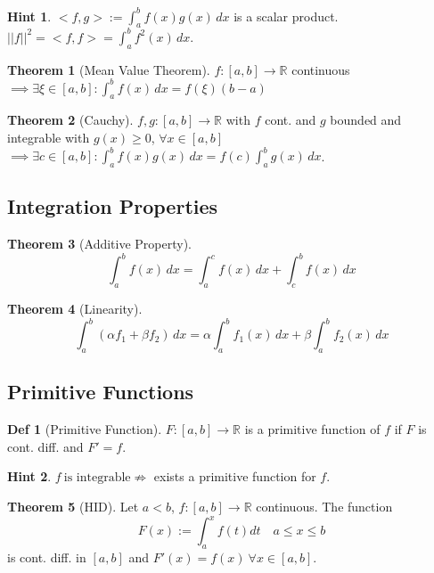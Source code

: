 \documentclass[a4paper, 10pt]{article}
\theoremstyle{definition}
\newtheorem*{definition}{Def}
\newtheorem*{note_wrapper}{Hint}
\theoremstyle{named}
\newtheorem*{ntheorem_wrapper}{Theorem}
\newenvironment{ntheorem}%
    {\begin{mdframed}[style=important]\begin{ntheorem_wrapper}}%
    {\end{ntheorem_wrapper}\end{mdframed}}
\newenvironment{note}%
    {\begin{mdframed}[style=trick]\begin{note_wrapper}}%
    {\end{note_wrapper}\end{mdframed}}
\newcommand{\R}{\mathbb{R}}
\begin{document}
\begin{note}
    $<f, g> := \int_a^b f(x)g(x) \,dx$ is a scalar product. \newline
    $||f||^2 = <f, f> = \int_a^b f^2(x) \,dx$.
\end{note}

\begin{ntheorem}[Mean Value Theorem]
    $f: [a, b] \to \R$ continuous $\implies \exists \xi \in [a, b]: \int_a^b f(x) \,dx = f(\xi)(b - a)$
\end{ntheorem}
\begin{ntheorem}[Cauchy]
    $f, g: [a, b] \to \R$ with $f$ cont. and $g$ bounded and integrable with $g(x) \geq 0$, $\forall x \in [a, b]$ $\implies \exists c \in [a, b]: \int_a^b f(x)g(x) \,dx = f(c)\int_a^b g(x) \,dx$.
\end{ntheorem}

\subsection{Integration Properties}
\begin{ntheorem}[Additive Property]
    $$\int_a^b f(x) \,dx = \int_a^c f(x) \,dx + \int_c^b f(x) \,dx$$
\end{ntheorem}

\begin{ntheorem}[Linearity]
    $$\int_a^b(\alpha f_1 + \beta f_2) \,dx = \alpha \int_a^b f_1(x) \,dx + \beta \int_a^b f_2(x) \,dx$$
\end{ntheorem}

\subsection{Primitive Functions}
\begin{definition}[Primitive Function]
    $F: [a, b] \to \R$ is a primitive function of $f$ if $F$ is cont. diff. and $F' = f$.
\end{definition}

\begin{note}
    $f \ \text{is integrable} \not\Rightarrow$ exists a primitive function for $f$.
\end{note}

\begin{ntheorem}[HID]
    Let $a < b$, $f: [a, b] \to \R$ continuous. The function 
    $$F(x) := \int_a^x f(t) dt \quad a \leq x \leq b$$
    is cont. diff. in $[a, b]$ and $F'(x) = f(x) \ \forall x \in [a, b]$.
\end{ntheorem}
\end{document}
